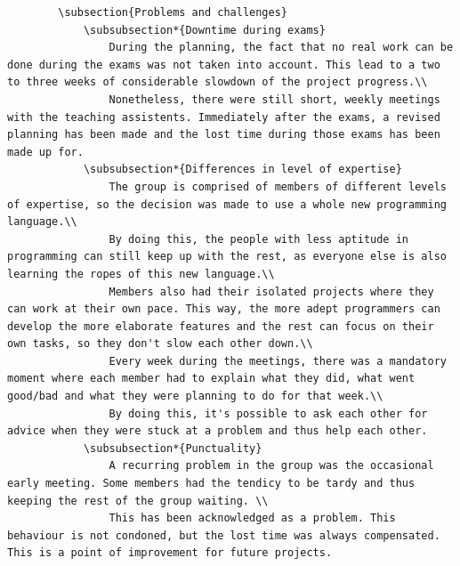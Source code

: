 \documentclass[10pt,a4paper]{report}
\begin{document}
\begin{lstlisting}
		\subsection{Problems and challenges}
			\subsubsection*{Downtime during exams}
				During the planning, the fact that no real work can be done during the exams was not taken into account. This lead to a two to three weeks of considerable slowdown of the project progress.\\
				Nonetheless, there were still short, weekly meetings with the teaching assistents. Immediately after the exams, a revised planning has been made and the lost time during those exams has been made up for.
			\subsubsection*{Differences in level of expertise}
				The group is comprised of members of different levels of expertise, so the decision was made to use a whole new programming language.\\ 
				By doing this, the people with less aptitude in programming can still keep up with the rest, as everyone else is also learning the ropes of this new language.\\
				Members also had their isolated projects where they can work at their own pace. This way, the more adept programmers can develop the more elaborate features and the rest can focus on their own tasks, so they don't slow each other down.\\ 
				Every week during the meetings, there was a mandatory moment where each member had to explain what they did, what went good/bad and what they were planning to do for that week.\\ 
				By doing this, it's possible to ask each other for advice when they were stuck at a problem and thus help each other.
			\subsubsection*{Punctuality}
				A recurring problem in the group was the occasional early meeting. Some members had the tendicy to be tardy and thus keeping the rest of the group waiting. \\
				This has been acknowledged as a problem. This behaviour is not condoned, but the lost time was always compensated. This is a point of improvement for future projects.

\end{lstlisting}
\end{document}
